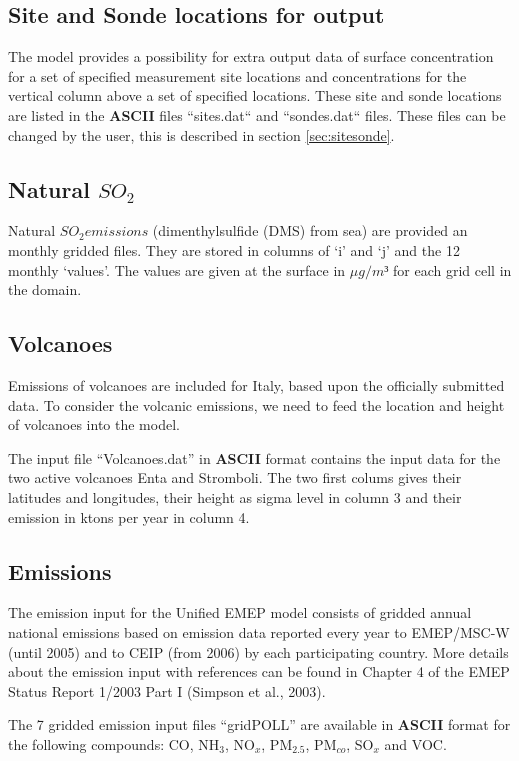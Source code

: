 \subsection{Site and Sonde locations for output}\label{sec:sitessondes_input}
The model provides a possibility for extra output data of surface concentration 
for a set of specified measurement site locations and concentrations for the vertical 
column above a set of specified locations. These site and sonde locations are listed 
in the {\bf ASCII} files ``sites.dat`` and ``sondes.dat`` files. These files can be 
changed by the user, this is described in section \ref{sec:sitesonde}.


\subsection{Natural $SO_2$}
Natural $SO_2 emissions$ (dimenthylsulfide (DMS) from sea) are provided 
an monthly gridded files. They are stored in columns of `i' and `j' and the 12 monthly `values'. 
The values are given at the surface in $\mu g /m³ $ for each grid cell in the domain. 

\subsection{Volcanoes}

Emissions of volcanoes are included for Italy, based upon the
officially submitted data.
To consider the volcanic emissions, we need to feed the location
and height of volcanoes into the model. 

The input file ``Volcanoes.dat'' in {\bf ASCII} format contains the input data for the two active volcanoes
 Enta and Stromboli. The two first colums gives their latitudes and longitudes, their height as sigma level
 in column 3 and their emission in ktons per year in column 4. 

\subsection{Emissions}
The emission input for the Unified EMEP model consists of gridded
annual national emissions based on emission data reported every year
to EMEP/MSC-W (until 2005) 
and to CEIP (from 2006) by each
participating country. 
More details about the emission input with references can be
found in Chapter 4 of the EMEP Status Report 1/2003 Part I 
(Simpson et al., 2003).

The 7 gridded emission input files ``gridPOLL'' are available in 
{\bf ASCII} format for the following compounds: CO, NH$_{3}$,
NO$_{x}$, PM$_{2.5}$, PM$_{co}$, SO$_{x}$ and VOC.

